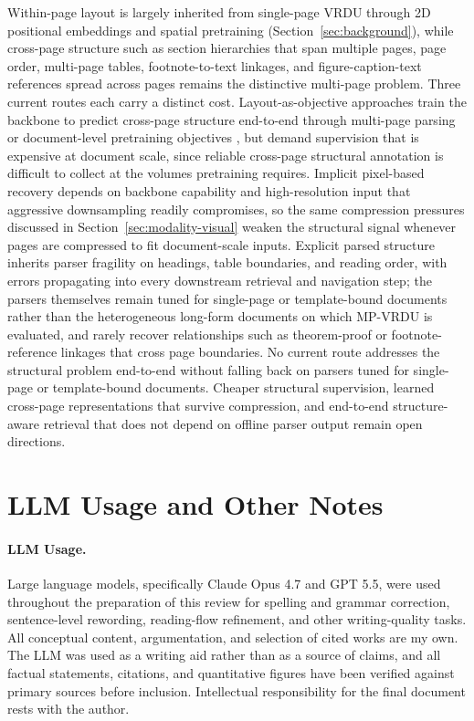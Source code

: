 \documentclass[11pt]{article}
\begin{document}
Within-page layout is largely inherited from single-page VRDU through 2D positional embeddings and spatial pretraining (Section~\ref{sec:background}), while cross-page structure such as section hierarchies that span multiple pages, page order, multi-page tables, footnote-to-text linkages, and figure-caption-text references spread across pages remains the distinctive multi-page problem. Three current routes each carry a distinct cost. Layout-as-objective approaches train the backbone to predict cross-page structure end-to-end through multi-page parsing or document-level pretraining objectives \cite{hu2025mplugdocowl2,duan2025docopilot}, but demand supervision that is expensive at document scale, since reliable cross-page structural annotation is difficult to collect at the volumes pretraining requires. Implicit pixel-based recovery depends on backbone capability and high-resolution input that aggressive downsampling readily compromises, so the same compression pressures discussed in Section~\ref{sec:modality-visual} weaken the structural signal whenever pages are compressed to fit document-scale inputs. Explicit parsed structure inherits parser fragility on headings, table boundaries, and reading order, with errors propagating into every downstream retrieval and navigation step; the parsers themselves remain tuned for single-page or template-bound documents rather than the heterogeneous long-form documents on which MP-VRDU is evaluated, and rarely recover relationships such as theorem-proof or footnote-reference linkages that cross page boundaries. No current route addresses the structural problem end-to-end without falling back on parsers tuned for single-page or template-bound documents. Cheaper structural supervision, learned cross-page representations that survive compression, and end-to-end structure-aware retrieval that does not depend on offline parser output remain open directions.
\section{LLM Usage and Other Notes}

\paragraph{LLM Usage.}
Large language models, specifically Claude Opus 4.7 and GPT 5.5, were used throughout the preparation of this review for spelling and grammar correction, sentence-level rewording, reading-flow refinement, and other writing-quality tasks. All conceptual content, argumentation, and selection of cited works are my own. The LLM was used as a writing aid rather than as a source of claims, and all factual statements, citations, and quantitative figures have been verified against primary sources before inclusion. Intellectual responsibility for the final document rests with the author.
\end{document}
